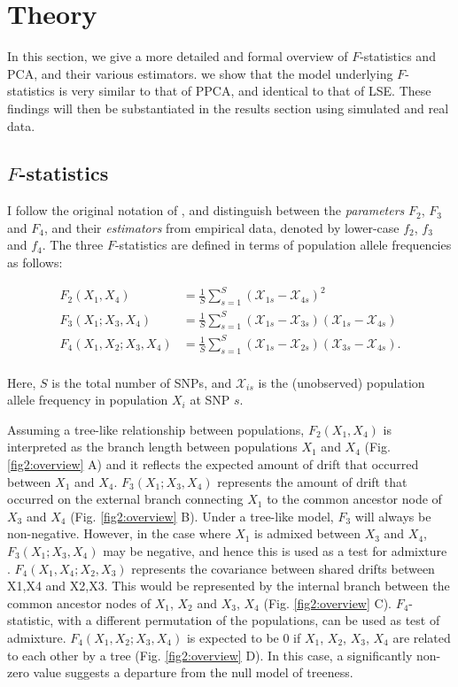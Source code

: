 \documentclass[12pt]{article}
\begin{document}
\section{Theory}\label{theory}
In this section, we give a more detailed and formal overview of $F$-statistics and PCA, and their various estimators. we show that the model underlying $F$-statistics is very similar to that of PPCA, and identical to that of LSE. These findings will then be substantiated in the results section using simulated and real data.

\subsection{$F$-statistics}\label{fstats}
I follow the original notation of \cite{patterson_ancient_2012}, and distinguish between the \textit{parameters} $F_2$, $F_3$ and $F_4$, and their \textit{estimators} from empirical data, denoted by lower-case $f_2$, $f_3$ and $f_4$. The three $F$-statistics are defined in terms of population allele frequencies as follows:

\begin{align}\label{eq:f_intro}
F_2(X_1,X_4) &= \frac{1}{S}\sum_{s=1}^S(\mathcal{X}_{1s} - \mathcal{X}_{4s})^2\nonumber\\
F_3(X_1;X_3,X_4) &= \frac{1}{S}\sum_{s=1}^S(\mathcal{X}_{1s} - \mathcal{X}_{3s})(\mathcal{X}_{1s} - \mathcal{X}_{4s})\nonumber\\
F_4(X_1,X_2;X_3,X_4) &= \frac{1}{S}\sum_{s=1}^S(\mathcal{X}_{1s} - \mathcal{X}_{2s})(\mathcal{X}_{3s} - \mathcal{X}_{4s}).\nonumber\\
\end{align}

Here, $S$ is the total number of SNPs, and $\mathcal{X}_{is}$ is the (unobserved) population allele frequency in population $X_i$ at SNP $s$. 

Assuming a tree-like relationship between populations, $F_2(X_1,X_4)$ is interpreted as the branch length between populations $X_1$ and $X_4$ (Fig. \ref{fig2:overview} A) and it reflects the expected amount of drift that occurred between $X_1$ and $X_4$. $F_3(X_1;X_3,X_4)$ represents the amount of drift that occurred on the external branch connecting $X_1$ to the common ancestor node of $X_3$ and $X_4$ (Fig. \ref{fig2:overview} B). Under a tree-like model, $F_3$ will always be non-negative. However, in the case where $X_1$ is admixed between $X_3$ and $X_4$, $F_3(X_1;X_3,X_4)$ may be negative, and hence this is used as a test for admixture \citep{peter_admixture_2016, patterson_ancient_2012}. $F_4(X_1,X_4;X_2,X_3)$ represents the covariance between shared drifts between X1,X4 and X2,X3. This would be represented by the internal branch between the common ancestor nodes of $X_1$, $X_2$ and $X_3$, $X_4$ (Fig. \ref{fig2:overview} C). $F_4$- statistic, with a different permutation of the populations, can be used as test of admixture. $F_4(X_1,X_2;X_3,X_4)$ is expected to be 0 if $X_1$, $X_2$, $X_3$, $X_4$ are related to each other by a tree (Fig. \ref{fig2:overview} D). In this case, a significantly non-zero value suggests a departure from the null model of treeness.
\end{document}
